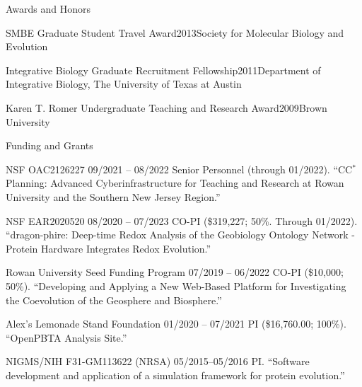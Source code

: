 \documentclass{resume} %
\begin{document}
\begin{rSection}{Awards and Honors}
\begin{rSubsection}{SMBE Graduate Student Travel Award}{2013}{Society for Molecular Biology and Evolution}{}
\end{rSubsection}

\begin{rSubsection}{Integrative Biology Graduate Recruitment Fellowship}{2011}{Department of Integrative Biology, The University of Texas at Austin}{}
\end{rSubsection}

\begin{rSubsection}{Karen T. Romer Undergraduate Teaching and Research Award}{2009}{Brown University}{}
\end{rSubsection}


\end{rSection}

\vspace*{0.35cm}
\begin{rSection}{Funding and Grants}
\vspace*{0.25cm}

\begin{rSubsection}
  {NSF OAC2126227}
  {09/2021 -- 08/2022}
  {Senior Personnel (through 01/2022). ``CC$^\ast$ Planning: Advanced Cyberinfrastructure for Teaching and Research at Rowan University and the Southern New Jersey Region.''}
\end{rSubsection}


\begin{rSubsection}
  {NSF EAR2020520}
  {08/2020 -- 07/2023}
  {CO-PI (\$319,227; 50\%. Through 01/2022). ``dragon-phire: Deep-time Redox Analysis of the Geobiology Ontology Network - Protein Hardware Integrates Redox Evolution.''}
\end{rSubsection}

\begin{rSubsection}
  {Rowan University Seed Funding Program}
  {07/2019 -- 06/2022}
  {CO-PI (\$10,000; 50\%). ``Developing and Applying a New Web-Based Platform for Investigating the Coevolution of the Geosphere and Biosphere.''}
\end{rSubsection}


\begin{rSubsection}
  {Alex's Lemonade Stand Foundation}
  {01/2020 -- 07/2021}
  {PI (\$16,760.00; 100\%). ``OpenPBTA Analysis Site.''}
\end{rSubsection}



\begin{rSubsection}
  {NIGMS/NIH F31-GM113622 (NRSA)}
  {05/2015--05/2016}
  {PI. ``Software development and application of a simulation framework for protein evolution.''}
\end{rSubsection}

\end{rSection}
\end{document}
